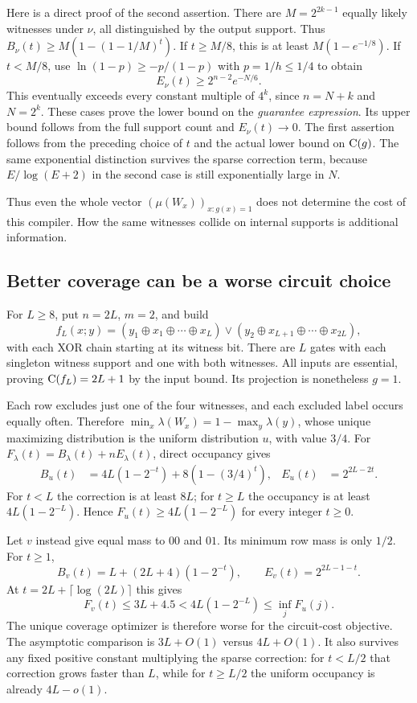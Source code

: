 Here is a direct proof of the second assertion. There are
$M=2^{2k-1}$ equally likely witnesses under $\nu$, all distinguished
by the output support. Thus
$B_\nu(t)\ge M(1-(1-1/M)^t)$. If $t\ge M/8$, this is at least
$M(1-e^{-1/8})$. If $t<M/8$, use
$\ln(1-p)\ge-p/(1-p)$ with $p=1/h\le1/4$ to obtain
\[
 E_\nu(t)\ge2^{n-2}e^{-N/6}.
\]
This eventually exceeds every constant multiple of $4^k$, since
$n=N+k$ and $N=2^k$. These cases prove the lower bound on the
\emph{guarantee expression}. Its upper bound follows from the full
support count and $E_\nu(t)\to0$. The first assertion follows from
the preceding choice of $t$ and the actual lower bound on $\mathrm{C}(g)$.
The same exponential distinction survives the sparse correction
term, because $E/\log(E+2)$ in the second case is still exponentially
large in $N$.

Thus even the whole vector $(\mu(W_x))_{x:g(x)=1}$ does not determine
the cost of this compiler. How the same witnesses collide on internal
supports is additional information.

\subsection{Better coverage can be a worse circuit choice}

For $L\ge8$, put $n=2L$, $m=2$, and build
\[
 f_L(x;y)=
 (y_1\oplus x_1\oplus\cdots\oplus x_L)
 \lor
 (y_2\oplus x_{L+1}\oplus\cdots\oplus x_{2L}),
\]
with each XOR chain starting at its witness bit. There are $L$ gates
with each singleton witness support and one with both witnesses.
All inputs are essential, proving $\mathrm{C}(f_L)=2L+1$ by the input bound.
Its projection is nonetheless $g=1$.

Each row excludes just one of the four witnesses, and each excluded
label occurs equally often. Therefore
$\min_x\lambda(W_x)=1-\max_y\lambda(y)$, whose unique maximizing
distribution is the uniform distribution $u$, with value $3/4$.
For $F_\lambda(t)=B_\lambda(t)+nE_\lambda(t)$, direct occupancy gives
\begin{align*}
 B_u(t)&=4L(1-2^{-t})+8(1-(3/4)^t),&
 E_u(t)&=2^{2L-2t}.
\end{align*}
For $t<L$ the correction is at least $8L$; for $t\ge L$ the
occupancy is at least $4L(1-2^{-L})$. Hence
$F_u(t)\ge4L(1-2^{-L})$ for every integer $t\ge0$.

Let $v$ instead give equal mass to $00$ and $01$. Its minimum row
mass is only $1/2$. For $t\ge1$,
\[
 B_v(t)=L+(2L+4)(1-2^{-t}),\qquad E_v(t)=2^{2L-1-t}.
\]
At $t=2L+\lceil\log(2L)\rceil$ this gives
\[
 F_v(t)\le3L+4.5<4L(1-2^{-L})\le\inf_j F_u(j).
\]
The unique coverage optimizer is therefore worse for the circuit-cost
objective. The asymptotic comparison is $3L+O(1)$ versus $4L+O(1)$.
It also survives any fixed positive constant multiplying the sparse
correction: for $t<L/2$ that correction grows faster than $L$, while
for $t\ge L/2$ the uniform occupancy is already $4L-o(1)$.

